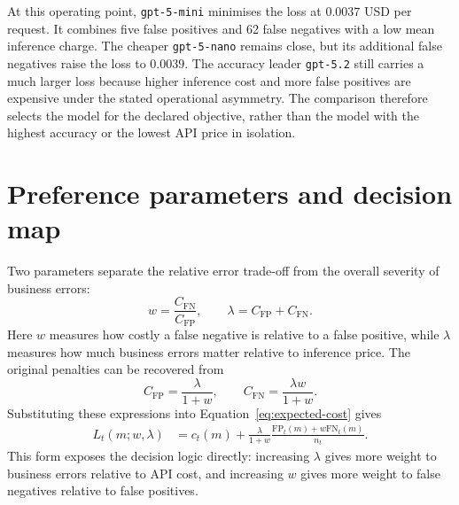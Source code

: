 \begin{table}[htbp]
    \centering
    \small
    \caption[Illustrative benchmark comparison under declared task losses]{Illustrative benchmark comparison on the common complete-case rerun set under \(C_{\mathrm{FP}}=0.155\) USD and \(C_{\mathrm{FN}}=0.031\) USD.}
    \label{tab:chapter4-cost-summary}
    
\end{table}

At this operating point, \texttt{gpt-5-mini} minimises the loss at \(0.0037\) USD per request. It combines five false positives and 62 false negatives with a low mean inference charge. The cheaper \texttt{gpt-5-nano} remains close, but its additional false negatives raise the loss to \(0.0039\). The accuracy leader \texttt{gpt-5.2} still carries a much larger loss because higher inference cost and more false positives are expensive under the stated operational asymmetry. The comparison therefore selects the model for the declared objective, rather than the model with the highest accuracy or the lowest API price in isolation.

\section{Preference parameters and decision map}
\label{sec:cost-parameters-uncertainty}

Two parameters separate the relative error trade-off from the overall severity of business errors:
\begin{equation}
    w
    =
    \frac{C_{\mathrm{FN}}}{C_{\mathrm{FP}}},
    \qquad
    \lambda
    =
    C_{\mathrm{FP}}+C_{\mathrm{FN}}.
    \label{eq:R-lambda-definition}
\end{equation}
Here \(w\) measures how costly a false negative is relative to a false positive, while \(\lambda\) measures how much business errors matter relative to inference price. The original penalties can be recovered from
\[
    C_{\mathrm{FP}}=\frac{\lambda}{1+w},
    \qquad
    C_{\mathrm{FN}}=\frac{\lambda w}{1+w}.
\]
Substituting these expressions into Equation~\eqref{eq:expected-cost} gives
\begin{align}
L_t(m;w,\lambda)
&=
c_t(m)
+
\frac{\lambda}{1+w}
\frac{
    \mathrm{FP}_t(m)+w\mathrm{FN}_t(m)
}{n_t}.
\label{eq:expected-cost-lambda-R}
\end{align}
This form exposes the decision logic directly: increasing \(\lambda\) gives more weight to business errors relative to API cost, and increasing \(w\) gives more weight to false negatives relative to false positives.

